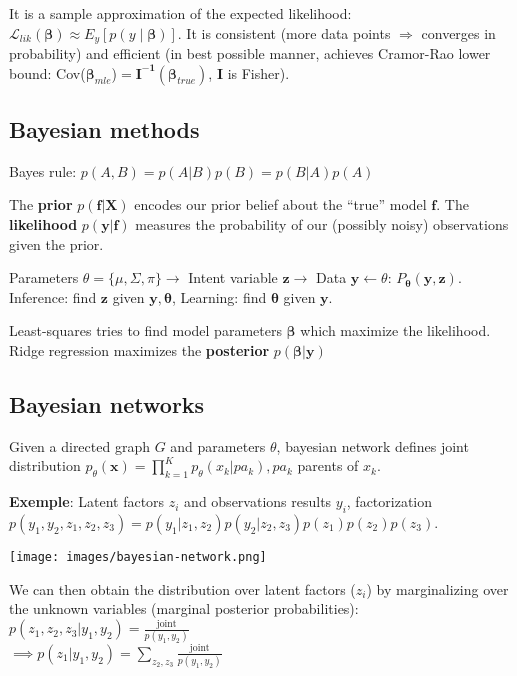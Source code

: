 \documentclass[10pt,a4paper,landscape]{extarticle}
\renewcommand{\bf}[1]{\ensuremath{\mathbf{#1}}}
\newcommand{\bbeta}{\boldsymbol\beta}
\newcommand{\btheta}{\boldsymbol\theta}
\begin{document}
\begin{multicols*}{4}
It is a sample approximation of the expected likelihood:
$\mathcal{L}_{lik}(\bbeta) \approx E_y[ p(y \mid \bbeta) ]$.
It is consistent (more data points $\Rightarrow$ converges in probability) and efficient (in best possible manner, achieves Cramor-Rao lower bound: Cov($\bbeta_{mle}$)$=\bf{I^{-1}}(\bbeta_{true})$, $\bf{I}$ is Fisher).

\subsection{Bayesian methods}
Bayes rule: $p(A, B) = p(A|B) p(B) = p(B|A) p(A)$

The \textbf{prior} $p(\bf{f}|\bf{X})$ encodes our prior belief about the ``true'' model $\bf{f}$. The \textbf{likelihood} $p(\bf{y}|\bf{f})$ measures the probability of our (possibly noisy) observations given the prior.

Parameters $\theta = \{\mu, \Sigma, \pi\} \rightarrow$ Intent variable $\bf{z} \rightarrow$ Data $\bf{y} \leftarrow \theta$: $P_{\btheta} (\bf{y}, \bf{z})$. Inference: find $\bf{z}$ given $\bf{y}, \btheta$, Learning: find $\btheta$ given $\bf{y}$.

Least-squares tries to find model parameters $\bbeta$ which maximize the likelihood. Ridge regression maximizes the \textbf{posterior} $p(\bbeta|\bf{y})$

\subsection{Bayesian networks}
Given a directed graph $G$ and parameters $\theta$, bayesian network defines joint distribution $p_{\theta}(\bf{x}) = \prod_{k=1}^K p_{\theta}(x_k | pa_k), pa_k$ parents of $x_k$. 

\textbf{Exemple}: Latent factors $z_i$ and observations results $y_i$, factorization $p(y_1, y_2, z_1, z_2, z_3) = p(y_1 | z_1, z_2) p(y_2 | z_2, z_3) p(z_1) p(z_2) p(z_3)$.

\begin{colfig}
  \centering
  \texttt{[image: images/bayesian-network.png]}
\end{colfig}

We can then obtain the distribution over latent factors ($z_i$) by marginalizing over the unknown variables (marginal posterior probabilities):
$p(z_1, z_2, z_3 | y_1, y_2) = \frac{\text{joint}}{p(y_1, y_2)}$\\
$\implies p(z_1 | y_1, y_2) = \sum_{z_2, z_3} \frac{\text{joint}}{p(y_1, y_2)}$


\end{multicols*}
\end{document}
